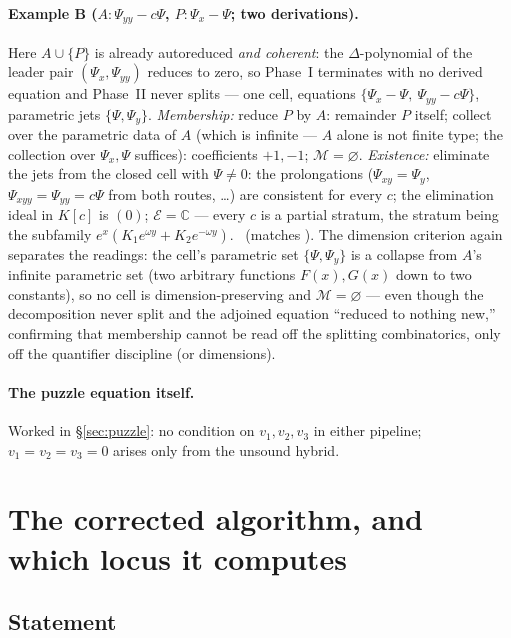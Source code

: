 \documentclass[11pt]{article}
\newcommand{\Psib}{\Psi}
\newcommand{\Mem}{\mathcal{M}}
\newcommand{\Ex}{\mathcal{E}}
\begin{document}
\paragraph{Example B ($A: \Psib_{yy}-c\Psib$, $P: \Psib_x-\Psib$; two
derivations).}
Here $A\cup\{P\}$ is already autoreduced \emph{and coherent}: the
$\Delta$-polynomial of the leader pair $(\Psib_x, \Psib_{yy})$ reduces to
zero, so Phase~I terminates with no derived equation and Phase~II never
splits --- one cell, equations $\{\Psib_x-\Psib,\ \Psib_{yy}-c\Psib\}$,
parametric jets $\{\Psib, \Psib_y\}$.
\emph{Membership:} reduce $P$ by $A$: remainder $P$ itself; collect over the
parametric data of $A$ (which is infinite --- $A$ alone is not finite type;
the collection over $\Psib_x, \Psib$ suffices): coefficients $+1,-1$;
$\Mem = \varnothing$. \checkmark
\emph{Existence:} eliminate the jets from the closed cell with
$\Psib \ne 0$: the prolongations
($\Psib_{xy} = \Psib_y$, $\Psib_{xyy} = \Psib_{yy} = c\Psib$ from both
routes, \dots) are consistent for every $c$; the elimination ideal in $K[c]$
is $(0)$; $\Ex = \mathbb{C}$ --- every $c$ is a partial stratum, the stratum
being the subfamily $e^x(K_1e^{\omega y}+K_2e^{-\omega y})$.
\checkmark\ (matches \cite[Ex.~2]{membership-note}). The dimension criterion
again separates the readings: the cell's parametric set $\{\Psib,\Psib_y\}$
is a collapse from $A$'s infinite parametric set (two arbitrary functions
$F(x), G(x)$ down to two constants), so no cell is dimension-preserving and
$\Mem = \varnothing$ --- even though the decomposition never split and the
adjoined equation ``reduced to nothing new,'' confirming that membership
cannot be read off the splitting combinatorics, only off the quantifier
discipline (or dimensions).

\paragraph{The puzzle equation itself.} Worked in
\S\ref{sec:puzzle}: no condition on $v_1,v_2,v_3$ in either pipeline;
$v_1=v_2=v_3=0$ arises only from the unsound hybrid. \checkmark

\section{The corrected algorithm, and which locus it computes}
\label{sec:corrected}

\subsection{Statement}
\end{document}
